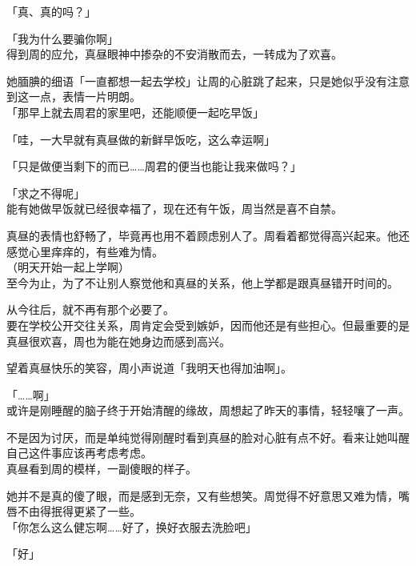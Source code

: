 「真、真的吗？」

「我为什么要骗你啊」\\

得到周的应允，真昼眼神中掺杂的不安消散而去，一转成为了欢喜。

她腼腆的细语「一直都想一起去学校」让周的心脏跳了起来，只是她似乎没有注意到这一点，表情一片明朗。\\

「那早上就去周君的家里吧，还能顺便一起吃早饭」

「哇，一大早就有真昼做的新鲜早饭吃，这么幸运啊」

「只是做便当剩下的而已……周君的便当也能让我来做吗？」

「求之不得呢」\\

能有她做早饭就已经很幸福了，现在还有午饭，周当然是喜不自禁。

真昼的表情也舒畅了，毕竟再也用不着顾虑别人了。周看着都觉得高兴起来。他还感觉心里痒痒的，有些难为情。\\

（明天开始一起上学啊）\\

至今为止，为了不让别人察觉他和真昼的关系，他上学都是跟真昼错开时间的。

从今往后，就不再有那个必要了。\\

要在学校公开交往关系，周肯定会受到嫉妒，因而他还是有些担心。但最重要的是真昼很欢喜，周也为能在她身边而感到高兴。

望着真昼快乐的笑容，周小声说道「我明天也得加油啊」。\\

\vspace{2\baselineskip}

「……啊」\\

或许是刚睡醒的脑子终于开始清醒的缘故，周想起了昨天的事情，轻轻嚷了一声。

不是因为讨厌，而是单纯觉得刚醒时看到真昼的脸对心脏有点不好。看来让她叫醒自己这件事应该再考虑考虑。\\

真昼看到周的模样，一副傻眼的样子。

她并不是真的傻了眼，而是感到无奈，又有些想笑。周觉得不好意思又难为情，嘴唇不由得抿得更紧了一些。\\

「你怎么这么健忘啊……好了，换好衣服去洗脸吧」

「好」\\

